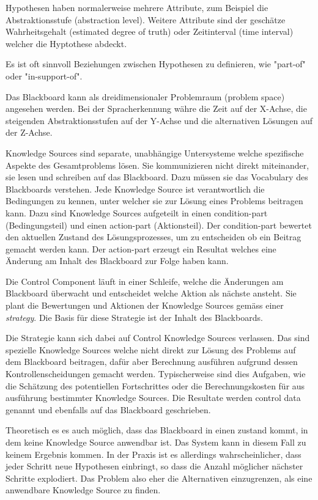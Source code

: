 Hypothesen haben normalerweise mehrere Attribute, zum Beispiel die Abstraktionsstufe (abstraction level). Weitere Attribute sind der geschätze Wahrheitsgehalt (estimated degree of truth) oder Zeitinterval (time interval) welcher die Hyptothese abdeckt.

Es ist oft sinnvoll Beziehungen zwischen Hypothesen zu definieren, wie "part-of" oder "in-support-of".

Das Blackboard kann als dreidimensionaler Problemraum (problem space) angesehen werden. Bei der Spracherkennung währe die Zeit auf der X-Achse, die steigenden Abstraktionsstufen auf der Y-Achse und die alternativen Lösungen auf der Z-Achse.

Knowledge Sources sind separate, unabhängige Untersysteme welche spezifische Aspekte des Gesamtproblems lösen. Sie kommunizieren nicht direkt miteinander, sie lesen und schreiben auf das Blackboard. Dazu müssen sie das Vocabulary des Blackboards verstehen. Jede Knowledge Source ist verantwortlich die Bedingungen zu kennen, unter welcher sie zur Lösung eines Problems beitragen kann. Dazu sind Knowledge Sources aufgeteilt in einen condition-part (Bedingungsteil) und einen action-part (Aktionsteil). Der condition-part bewertet den aktuellen Zustand des Lösungsprozesses, um zu entscheiden ob ein Beitrag gemacht werden kann. Der action-part erzeugt ein Resultat welches eine Änderung am Inhalt des Blackboard zur Folge haben kann.

Die Control Component läuft in einer Schleife, welche die Änderungen am Blackboard überwacht und entscheidet welche Aktion als nächste ansteht. Sie plant die Bewertungen und Aktionen der Knowledge Sources gemäss einer \textit{strategy}. Die Basis für diese Strategie ist der Inhalt des Blackboards.

Die Strategie kann sich dabei auf Control Knowledge Sources verlassen. Das sind spezielle Knowledge Sources welche nicht direkt zur Lösung des Problems auf dem Blackboard beitragen, dafür aber Berechnung ausführen aufgrund dessen Kontrollenscheidungen gemacht werden. Typischerweise sind dies Aufgaben, wie die Schätzung des potentiellen Fortschrittes oder die Berechnungskosten für aus ausführung bestimmter Knowledge Sources. Die Resultate werden control data genannt und ebenfalls auf das Blackboard geschrieben.

Theoretisch es es auch möglich, dass das Blackboard in einen zustand kommt, in dem keine Knowledge Source anwendbar ist. Das System kann in diesem Fall zu keinem Ergebnis kommen. In der Praxis ist es allerdings wahrscheinlicher, dass jeder Schritt neue Hypothesen einbringt, so dass die Anzahl möglicher nächster Schritte explodiert. Das Problem also eher die Alternativen einzugrenzen, als eine anwendbare Knowledge Source zu finden.

